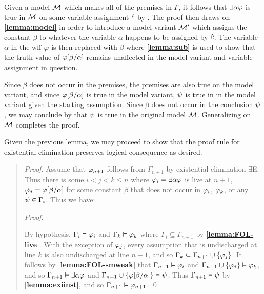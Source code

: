 Given a model $\mathcal{M}$ which makes all of the premises in $\Gamma$, it follows that $\exists \alpha\varphi$ is true in $\mathcal{M}$ on some variable assignment $\hat{c}$ by .
The proof then draws on \textbf{\ref{lemma:model}} in order to introduce a model variant $\mathcal{M}'$ which assigns the constant $\beta$ to whatever the variable $\alpha$ happens to be assigned by $\hat{c}$.
The variable $\alpha$ in the wff $\varphi$ is then replaced with $\beta$ where \textbf{\ref{lemma:sub}} is used to show that the truth-value of $\varphi[\beta/\alpha]$ remains unaffected in the model variant and variable assignment in question.

Since $\beta$ does not occur in the premises, the premises are also true on the model variant, and since $\varphi[\beta/\alpha]$ is true in the model variant, $\psi$ is true in in the model variant given the starting assumption.
Since $\beta$ does not occur in the conclusion $\psi$, we may conclude by  that $\psi$ is true in the original model $\mathcal{M}$. 
Generalizing on $\mathcal{M}$ completes the proof. 

Given the previous lemma, we may proceed to show that the proof rule for existential elimination preserves logical consequence as desired.





\begin{quote} 
  \textit{Proof:} Assume that $\varphi_{n+1}$ follows from $\Gamma_{n+1}$ by existential elimination $\exists$E.
  Thus there is some $i<j<k\leq n$ where $\varphi_i=\exists \alpha\varphi$ is live at $n+1$, $\varphi_j=\varphi[\beta/\alpha]$ for some constant $\beta$ that does not occur in $\varphi_i$, $\varphi_k$, or any $\psi\in\Gamma_i$.
  Thus we have:

  \begin{proof}
    \open	
       
    \close
     
  \end{proof}

  By hypothesis, $\Gamma_i\vDash\varphi_i$ and $\Gamma_k\vDash\varphi_k$ where $\Gamma_i\subseteq \Gamma_{n+1}$ by \textbf{\ref{lemma:FOL-live}}.
  With the exception of $\varphi_j$, every assumption that is undischarged at line $k$ is also undischarged at line $n+1$, and so $\Gamma_k\subseteq\Gamma_{n+1}\cup\lbrace\varphi_j\rbrace$.
  It follows by \textbf{\ref{lemma:FOL-smweak}} that $\Gamma_{n+1} \vDash \varphi_i$ and $\Gamma_{n+1}\cup\lbrace\varphi_j\rbrace \vDash \varphi_k$, and so $\Gamma_{n+1} \vDash \exists \alpha\varphi$ and $\Gamma_{n+1}\cup\lbrace\varphi[\beta/\alpha]\rbrace \vDash \psi$.
  Thus $\Gamma_{n+1}\vDash\psi$ by \textbf{\ref{lemma:exiinst}}, and so $\Gamma_{n+1}\vDash\varphi_{n+1}$.
  \qed
\end{quote}

